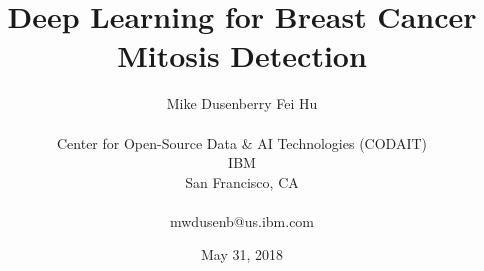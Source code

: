 \title{Deep Learning for Breast Cancer Mitosis Detection}
\author{%
Mike Dusenberry \qquad Fei Hu \\
\\
Center for Open-Source Data \& AI Technologies (CODAIT) \\
IBM \\
San Francisco, CA \\
\\
mwdusenb@us.ibm.com
%
%
%
}
\date{May 31, 2018}

\maketitle

